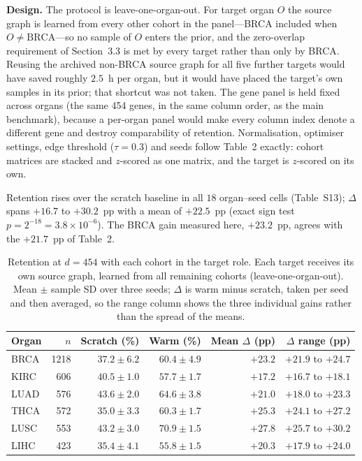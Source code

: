 \documentclass[11pt]{article}
\begin{document}
\noindent\textbf{Design.} The protocol is leave-one-organ-out. For target organ $O$ the
source graph is learned from every other cohort in the panel---BRCA included when
$O \neq \mathrm{BRCA}$---so no sample of $O$ enters the prior, and the zero-overlap
requirement of Section~3.3 is met by every target rather than only by BRCA. Reusing the
archived non-BRCA source graph for all five further targets would have saved roughly
$2.5$~h per organ, but it would have placed the target's own samples in its prior; that
shortcut was not taken. The gene panel is held fixed across organs (the same 454 genes,
in the same column order, as the main benchmark), because a per-organ panel would make
every column index denote a different gene and destroy comparability of retention.
Normalisation, optimiser settings, edge threshold ($\tau=0.3$) and seeds follow
Table~2 exactly: cohort matrices are stacked and $z$-scored as one matrix, and the
target is $z$-scored on its own.

\noindent Retention rises over the scratch baseline in all $18$ organ--seed cells
(Table~S13); $\Delta$ spans $+16.7$ to $+30.2$~pp with a mean of $+22.5$~pp (exact sign
test $p=2^{-18}=3.8\times10^{-6}$). The BRCA gain measured here, $+23.2$~pp, agrees with
the $+21.7$~pp of Table~2.

\setcounter{table}{12}
\begin{table}[H]
\caption{Retention at $d=454$ with each cohort in the target role. Each target receives
its own source graph, learned from all remaining cohorts (leave-one-organ-out). Mean
$\pm$ sample SD over three seeds; $\Delta$ is warm minus scratch, taken per seed and
then averaged, so the range column shows the three individual gains rather than the
spread of the means.}
\begin{tabular}{@{}lrrrrr@{}}
\toprule
Organ & $n$ & Scratch (\%) & Warm (\%) & Mean $\Delta$ (pp) & $\Delta$ range (pp)\\
\midrule
BRCA  & 1218 & $37.2\pm6.2$ & $60.4\pm4.9$ & $+23.2$ & $+21.9$ to $+24.7$ \\
KIRC  & 606 & $40.5\pm1.0$ & $57.7\pm1.7$ & $+17.2$ & $+16.7$ to $+18.1$ \\
LUAD  & 576 & $43.6\pm2.0$ & $64.6\pm3.8$ & $+21.0$ & $+18.0$ to $+23.3$ \\
THCA  & 572 & $35.0\pm3.3$ & $60.3\pm1.7$ & $+25.3$ & $+24.1$ to $+27.2$ \\
LUSC  & 553 & $43.2\pm3.0$ & $70.9\pm1.5$ & $+27.8$ & $+25.7$ to $+30.2$ \\
LIHC  & 423 & $35.4\pm4.1$ & $55.8\pm1.5$ & $+20.3$ & $+17.9$ to $+24.0$ \\
\bottomrule
\end{tabular}
\label{tab:S13}
\end{table}
\end{document}
